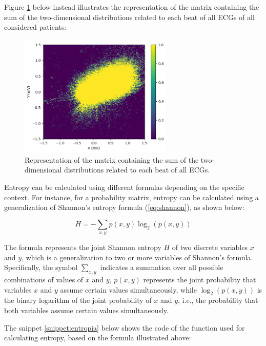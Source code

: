 \documentclass[12pt,english]{report}
\begin{document}
Figure \ref{fig:each_beat_all_ecg} below instead illustrates the representation of the matrix containing the sum of the two-dimensional distributions related to each beat of all ECGs of all considered patients:

\begin{figure}[H]
    \centering
    \includegraphics[width=0.65\textwidth]{images/each_beat_all_ecg.png}
    \captionsetup{justification=centering}
    \caption{Representation of the matrix containing the sum of the two-dimensional distributions related to each beat of all ECGs.}
    \label{fig:each_beat_all_ecg}
\end{figure}

Entropy can be calculated using different formulas depending on the specific context. For instance, for a probability matrix, entropy can be calculated using a generalization of Shannon's entropy formula (\ref{eq:shannon}), as shown below:

\begin{equation}
    H = - \sum_{x,y} p(x,y) \log_2(p(x,y))
    \label{eq:shannon}
\end{equation}

The formula represents the joint Shannon entropy $ H $ of two discrete variables $ x $ and $ y $, which is a generalization to two or more variables of Shannon's formula. Specifically, the symbol $ \sum_{x,y} $ indicates a summation over all possible combinations of values of $ x $ and $ y $, $ p(x,y) $ represents the joint probability that variables $ x $ and $ y $ assume certain values simultaneously, while $ \log_2(p(x,y)) $ is the binary logarithm of the joint probability of $ x $ and $ y $, i.e., the probability that both variables assume certain values simultaneously.

The snippet \ref{snippet:entropia} below shows the code of the function used for calculating entropy, based on the formula illustrated above:
\end{document}
